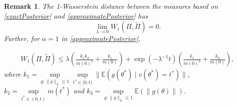 \documentclass[10pt,fleqn]{article}
\newtheorem{remark}{Remark}
\newcommand{\mc}[1]{\mathcal{#1}}
\DeclareMathOperator{\1}{\mathbbm{1}}
\begin{document}


\begin{remark}
The 1-Wasserstein distance between the measures based on \eqref{exactPosterior} and \eqref{approximatePosterior} has
$$ \underset{\lambda \rightarrow 0}\lim W_1(\Pi,\tilde\Pi)=0.$$
Further, for $\alpha=1$ in \eqref{approximatePosterior},

\begin{equation}
\begin{aligned}
W_1(\Pi,\tilde\Pi) \le \lambda (\frac{k_1 k_2}{m(0)^2} + \frac{k_1}{m(0)}) + \exp(- \lambda^{-1} t )(\frac{k_1}{m(0)^2} + \frac{k_3}{m(0)}),
\end{aligned}
\end{equation}
where $k_1=\underset{g:\|g\|_L\le 1}\sup\underset{t^*\in [0,t)}\sup \|\mathbb{E}(g(\theta^*) \mid v(\theta^*)=t^*)\|$, $k_2= \underset{t^*\in (0,t)}\sup  m(t^{*})$ and $k_3=\underset{g:\|g\|_L\le 1} \sup \mathbb{E}(\| g(\theta )\|)$.
\end{remark}
\end{document}
